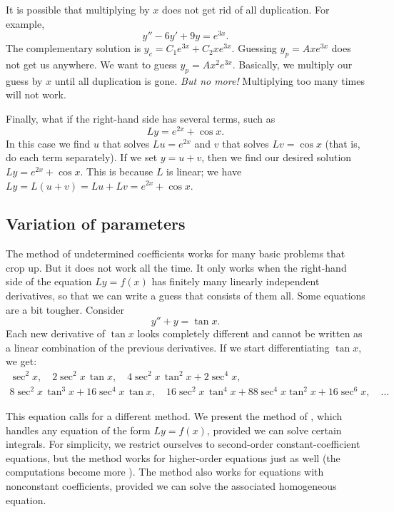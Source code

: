 \medskip

It is possible that
multiplying by $x$ does not get rid of all
duplication.  For example,
\begin{equation*}
y''-6y'+9y = e^{3x} .
\end{equation*}
The complementary solution is
$y_c = C_1 e^{3x} + C_2 x e^{3x}$.  Guessing $y_p=A xe^{3x}$
does not get us anywhere.
We want to guess $y_p = Ax^2e^{3x}$.
Basically, we multiply our guess by $x$
until all duplication is gone.  \emph{But no more!}  Multiplying too many
times will not work.

\medskip

Finally, what if the right-hand side has several terms, such as
\begin{equation*}
Ly = e^{2x} + \cos x .
\end{equation*}
In this case we find $u$ that solves $Lu = e^{2x}$ and $v$ that
solves $Lv = \cos x$ (that is, do each term separately).
If we set
$y = u+ v$, then we find our desired solution $Ly = e^{2x} + \cos x$.
This is because $L$ is linear; we have
$Ly = L(u+v) = Lu + Lv = e^{2x} + \cos x$.

\subsection{Variation of parameters}

The method of undetermined coefficients works for many basic
problems that crop up.  But it does not work all the time.  It only works
when the right-hand side of the equation $Ly = f(x)$ has finitely many
linearly independent derivatives, so that we can write a guess that consists
of them all.  Some equations are a bit tougher.  Consider
\begin{equation*}
y''+y = \tan x .
\end{equation*}
Each new derivative of $\tan x$ looks completely different and
cannot be written as a linear combination of the previous derivatives.
If we start differentiating $\tan x$, we get:
\begin{multline*}
\sec^2 x, \quad
2\sec^2 x \, \tan x, \quad
4 \sec^2 x \, \tan^2 x + 2 \sec^4 x, \\
8 \sec^2 x \, \tan^3 x + 16 \sec^4 x \, \tan x, \quad
16\sec^2 x \, \tan^4 x + 88 \sec^4 x \tan^2 x + 16 \sec^6 x, \quad
\ldots
\end{multline*}

This equation calls for a different method.  We present the method of
\emph{}, which handles any equation of
the form $Ly = f(x)$,
provided we can solve certain integrals.  For simplicity, we restrict
ourselves to second-order constant-coefficient equations,
but the method works for
higher-order equations just as well (the computations become more
). %
The method also works for equations with nonconstant coefficients,
provided we can solve the associated homogeneous equation.


